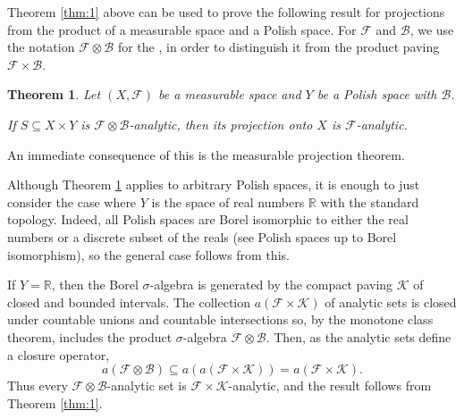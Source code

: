 \documentclass[12pt]{article}
\newtheorem{theorem}{Theorem}
\begin{document}
Theorem \ref{thm:1} above can be used to prove the following result for projections from the product of a measurable space and a Polish space. For  $\mathcal{F}$ and $\mathcal{B}$, we use the notation $\mathcal{F}\otimes\mathcal{B}$ for the , in order to distinguish it from the product paving $\mathcal{F}\times\mathcal{B}$.

\begin{theorem}\label{thm:2}
Let $(X,\mathcal{F})$ be a measurable space and $Y$ be a Polish space with  $\mathcal{B}$.

If $S\subseteq X\times Y$ is $\mathcal{F}\otimes\mathcal{B}$-analytic, then its projection onto $X$ is $\mathcal{F}$-analytic.
\end{theorem}

An immediate consequence of this is the measurable projection theorem.

Although Theorem \ref{thm:2} applies to arbitrary Polish spaces, it is enough to just consider the case where $Y$ is the space of real numbers $\mathbb{R}$ with the standard topology. Indeed, all Polish spaces are Borel isomorphic to either the real numbers or a discrete subset of the reals (see Polish spaces up to Borel isomorphism), so the general case follows from this.

If $Y=\mathbb{R}$, then the Borel $\sigma$-algebra is generated by the compact paving $\mathcal{K}$ of closed and bounded intervals. The collection $a(\mathcal{F}\times\mathcal{K})$ of analytic sets is closed under countable unions and countable intersections so, by the monotone class theorem, includes the product $\sigma$-algebra $\mathcal{F}\otimes\mathcal{B}$. Then, as the analytic sets define a closure operator,
\begin{equation*}
a(\mathcal{F}\otimes\mathcal{B})\subseteq a(a(\mathcal{F}\times\mathcal{K}))=a(\mathcal{F}\times\mathcal{K}).
\end{equation*}
Thus every $\mathcal{F}\otimes\mathcal{B}$-analytic set is $\mathcal{F}\times\mathcal{K}$-analytic, and the result follows from Theorem \ref{thm:1}.

\end{document}
